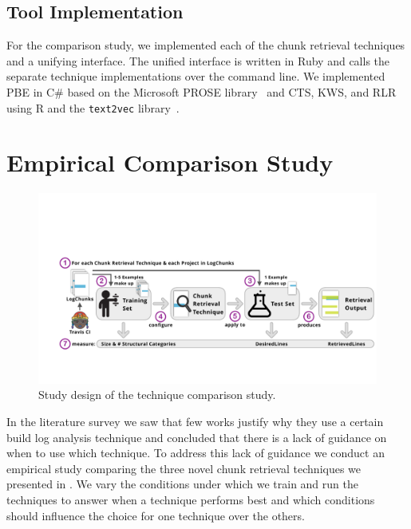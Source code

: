 \subsection{Tool Implementation}
For the comparison study, we implemented each of the chunk retrieval
techniques and a unifying interface.
The unified interface is written in Ruby and
calls the separate technique implementations over the command line.
We implemented PBE in C\# based on the Microsoft PROSE
library~\cite{prose2019webpage} and CTS, KWS, and RLR using
R and the {\tt text2vec} library~\cite{text2vec2019webpage}.

\section{Empirical Comparison Study}
\label{sec:study}

\begin{figure}[tb]
	\centering
	\includegraphics[width=\textwidth, trim={1.6cm 2.5cm 0.2cm 4.8cm},
  clip]{img/study.pdf}
	\caption{Study design of the technique comparison study.}
	\label{fig:study}
\end{figure}

In the literature survey we saw that few works justify why they
use a certain build log analysis technique and concluded that there
is a lack of guidance on when to use which technique.
To address this lack of guidance we conduct an empirical study
comparing the three novel chunk retrieval techniques we presented in
.
We vary the conditions under which we train and run the techniques
to answer when a technique performs best and which conditions should
influence the choice for one technique over the others.

